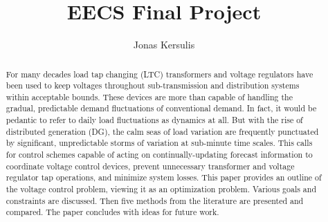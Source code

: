 \documentclass[10pt,letterpaper]{article}
\author{Jonas Kersulis}
\title{EECS Final Project}
\begin{document}
\maketitle

\begin{comment}

    
    
    
    
    
\end{comment}

\begin{abstract}
For many decades load tap changing (LTC) transformers and voltage regulators have been used to keep voltages throughout sub-transmission and distribution systems within acceptable bounds. These devices are more than capable of handling the gradual, predictable demand fluctuations of conventional demand. In fact, it would be pedantic to refer to daily load fluctuations as dynamics at all. But with the rise of distributed generation (DG), the calm seas of load variation are frequently punctuated by significant, unpredictable storms of variation at sub-minute time scales. This calls for control schemes capable of acting on continually-updating forecast information to coordinate voltage control devices, prevent unnecessary transformer and voltage regulator tap operations, and minimize system losses. This paper provides an outline of the voltage control problem, viewing it as an optimization problem. Various goals and constraints are discussed. Then five methods from the literature are presented and compared. The paper concludes with ideas for future work.
\end{abstract}
\end{document}
